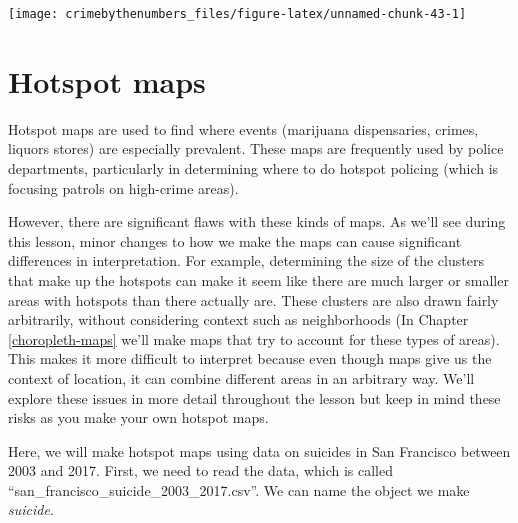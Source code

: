 \documentclass[
  12pt,
]{book}
\begin{document}
\begin{center}\texttt{[image: crimebythenumbers\_files/figure-latex/unnamed-chunk-43-1]} \end{center}

\hypertarget{hotspot-maps}{%
\chapter{Hotspot maps}\label{hotspot-maps}}

Hotspot maps are used to find where events (marijuana dispensaries, crimes, liquors stores) are especially prevalent. These maps are frequently used by police departments, particularly in determining where to do hotspot policing (which is focusing patrols on high-crime areas).

However, there are significant flaws with these kinds of maps. As we'll see during this lesson, minor changes to how we make the maps can cause significant differences in interpretation. For example, determining the size of the clusters that make up the hotspots can make it seem like there are much larger or smaller areas with hotspots than there actually are. These clusters are also drawn fairly arbitrarily, without considering context such as neighborhoods (In Chapter \ref{choropleth-maps} we'll make maps that try to account for these types of areas). This makes it more difficult to interpret because even though maps give us the context of location, it can combine different areas in an arbitrary way. We'll explore these issues in more detail throughout the lesson but keep in mind these risks as you make your own hotspot maps.

Here, we will make hotspot maps using data on suicides in San Francisco between 2003 and 2017. First, we need to read the data, which is called ``san\_francisco\_suicide\_2003\_2017.csv''. We can name the object we make \emph{suicide}.
\end{document}
